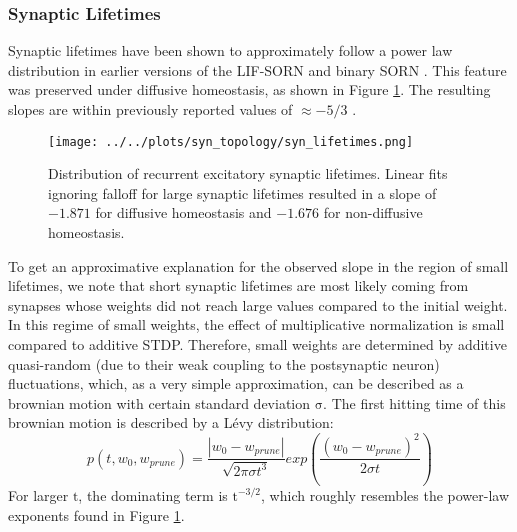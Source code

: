 \documentclass[10pt,a4paper]{article}
\begin{document}
\subsubsection{Synaptic Lifetimes}
Synaptic lifetimes have been shown to approximately follow a power law distribution in earlier versions of the LIF-SORN and binary SORN \cite{SORN_Paper,Pengsheng_2013}. This feature was preserved under diffusive homeostasis, as shown in Figure \ref{Syn_Lifetimes}. The resulting slopes are within previously reported values of $\mathrm{\approx - 5/3}$ \cite{SORN_Paper}.
\begin{figure}
\texttt{[image: ../../plots/syn\_topology/syn\_lifetimes.png]}
\caption{Distribution of recurrent excitatory synaptic lifetimes. Linear fits ignoring falloff for large synaptic lifetimes resulted in a slope of $\mathrm{-1.871}$ for diffusive homeostasis and $\mathrm{-1.676}$ for non-diffusive homeostasis.}
\label{Syn_Lifetimes}
\end{figure}
To get an approximative explanation for the observed slope in the region of small lifetimes, we note that short synaptic lifetimes are most likely coming from synapses whose weights did not reach large values compared to the initial weight. In this regime of small weights, the effect of multiplicative normalization is small compared to additive STDP. Therefore, small weights are determined by additive quasi-random (due to their weak coupling to the postsynaptic neuron) fluctuations, which, as a very simple approximation, can be described as a brownian motion with certain standard deviation $\mathrm{\sigma}$. The first hitting time of this brownian motion is described by a Lévy distribution:
\begin{equation}
p(t,w_0,w_{prune}) = \frac{|w_0-w_{prune}|}{\sqrt{2\pi \sigma t^3}}exp \left( \frac{(w_0-w_{prune})^2}{2\sigma t}\right)
\label{Levy_Dist}
\end{equation}
For larger $\mathrm{t}$, the dominating term is $\mathrm{t^{-3/2}}$, which roughly resembles the power-law exponents found in Figure \ref{Syn_Lifetimes}.
\end{document}
